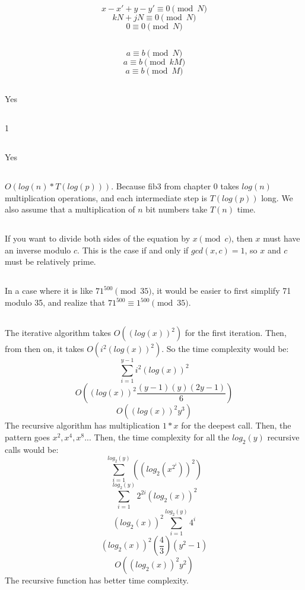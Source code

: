 \documentclass{article}
\begin{document}
\subsection{}$$x - x' + y - y' \equiv 0 \pmod N$$
$$kN+jN \equiv 0 \pmod N$$
$$0 \equiv 0 \pmod N$$
\subsection{}$$a \equiv b \pmod N$$
$$a \equiv b \pmod {kM}$$
$$a \equiv b \pmod M$$
\subsection{}Yes
\subsection{}1
\subsection{}Yes
\subsection{}
$O(log(n)*T(log(p)))$. Because fib3 from chapter 0 takes $log(n)$ multiplication operations, and each intermediate step is $T(log(p))$ long. We also assume that a multiplication of $n$ bit numbers take $T(n)$ time.
\subsection{}If you want to divide both sides of the equation by $x\pmod c$, then $x$ must have an inverse modulo $c$. This is the case if and only if $gcd(x,c)=1$, so $x$ and $c$ must be relatively prime.  
\subsection{}In a case where it is like $71^{500} \pmod {35}$, it would be easier to first simplify 71 modulo 35, and realize that $71^{500} \equiv 1^{500} \pmod {35}$. 
\subsection{}The iterative algorithm takes $O((log(x))^2)$ for the first iteration. Then, from then on, it takes $O(i^2(log(x))^2)$. So the time complexity would be:
$$\sum_{i=1}^{y-1}i^2(log(x))^2$$
$$O((log(x))^2\frac{(y-1)(y)(2y-1)}{6})$$
$$O((log(x))^2y^3)$$
The recursive algorithm has multiplication $1*x$ for the deepest call. Then, the pattern goes $x^2, x^4, x^8...$ Then, the time complexity for all the $log_2(y)$ recursive calls would be:
$$\sum_{i=1}^{log_2(y)}((log_2(x^{2^i}))^2)$$
$$\sum_{i=1}^{log_2(y)}2^{2i}(log_2(x))^2$$
$$(log_2(x))^2\sum_{i=1}^{log_2(y)}4^{i}$$
$$(log_2(x))^2(\frac{4}{3})(y^2-1)$$
$$O((log_2(x))^2y^2)$$
The recursive function has better time complexity. 
\end{document}
